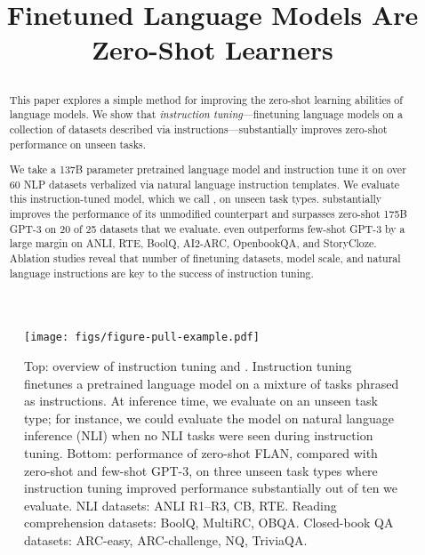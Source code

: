 \title{Finetuned Language Models Are Zero-Shot Learners \raggedright}



\maketitle
\vspace{-2mm}
\begin{abstract}

This paper explores a simple method for improving the zero-shot learning abilities of language models. 
We show that \textit{instruction tuning}---finetuning language models on a collection of datasets described via instructions---substantially improves zero-shot performance on unseen tasks.\vspace{1mm}

We take a 137B parameter pretrained language model and instruction tune it on over 60 NLP datasets verbalized via natural language instruction templates.
We evaluate this instruction-tuned model, which we call \flan{}, on unseen task types.
\flan{} substantially improves the performance of its unmodified counterpart and surpasses zero-shot 175B GPT-3 on 20 of 25 datasets that we evaluate.
\flan{} even outperforms few-shot GPT-3 by a large margin on ANLI, RTE, BoolQ, AI2-ARC, OpenbookQA, and StoryCloze.
Ablation studies reveal that number of finetuning datasets, model scale, and natural language instructions are key to the success of instruction tuning.

\end{abstract}

\vspace{-3mm}
\begin{figure}[h]
    \centering
    \texttt{[image: figs/figure-pull-example.pdf]}
    \vspace{-2mm}
    \caption{
    Top: overview of instruction tuning and \flan. Instruction tuning finetunes a pretrained language model on a mixture of tasks phrased as instructions.
    At inference time, we evaluate on an unseen task type; for instance, we could evaluate the model on natural language inference (NLI) when no NLI tasks were seen during instruction tuning.
    Bottom: performance of zero-shot FLAN, compared with zero-shot and few-shot GPT-3, on three unseen task types where instruction tuning improved performance substantially out of ten we evaluate.
    NLI datasets: ANLI R1--R3, CB, RTE. Reading comprehension datasets: BoolQ, MultiRC, OBQA. Closed-book QA datasets: ARC-easy, ARC-challenge, NQ, TriviaQA.
    }
    \label{fig:flan-pull}
\end{figure}


